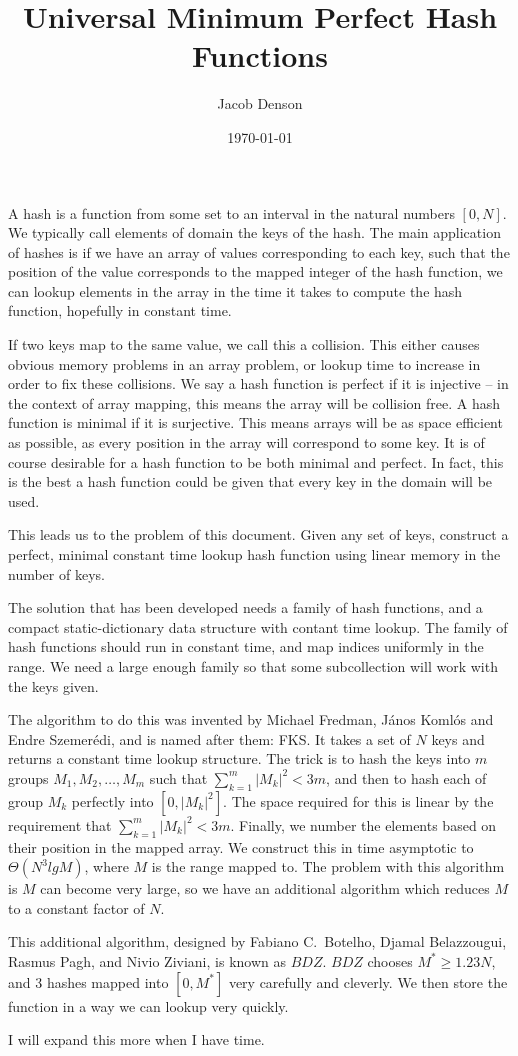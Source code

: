 \documentclass{article}
\title{Universal Minimum Perfect Hash Functions}
\author{Jacob Denson}
\date{\today}
\begin{document}
\maketitle

A hash is a function from some set to an interval in the natural numbers $[0,N]$. We typically call elements of domain the keys of the hash. The main application of hashes is if we have an array of values corresponding to each key, such that the position of the value corresponds to the mapped integer of the hash function, we can lookup elements in the array in the time it takes to compute the hash function, hopefully in constant time.

If two keys map to the same value, we call this a collision. This either causes obvious memory problems in an array problem, or lookup time to increase in order to fix these collisions. We say a hash function is perfect if it is injective -- in the context of array mapping, this means the array will be collision free. A hash function is minimal if it is surjective. This means arrays will be as space efficient as possible, as every position in the array will correspond to some key. It is of course desirable for a hash function to be both minimal and perfect. In fact, this is the best a hash function could be given that every key in the domain will be used.

This leads us to the problem of this document. Given any set of keys, construct a perfect, minimal constant time lookup hash function using linear memory in the number of keys.

The solution that has been developed needs a family of hash functions, and a compact static-dictionary data structure with contant time lookup. The family of hash functions should run in constant time, and map indices uniformly in the range. We need a large enough family so that some subcollection will work with the keys given.

The algorithm to do this was invented by Michael Fredman, J\'{a}nos Koml\'{o}s and Endre Szemer\'{e}di, and is named after them: FKS. It takes a set of $N$ keys and returns a constant time lookup structure. The trick is to hash the keys into $m$ groups $M_1, M_2, \dots, M_m$ such that $\sum_{k = 1}^{m} |M_k|^2 < 3m$, and then to hash each of group $M_k$ perfectly into $[0,|M_k|^2]$. The space required for this is linear by the requirement that $\sum_{k = 1}^{m} |M_k|^2 < 3m$. Finally, we number the elements based on their position in the mapped array. We construct this in time asymptotic to $\Theta(N^3lgM)$, where $M$ is the range mapped to. The problem with this algorithm is $M$ can become very large, so we have an additional algorithm which reduces $M$ to a constant factor of $N$.

This additional algorithm, designed by Fabiano C.\ Botelho, Djamal Belazzougui, Rasmus Pagh, and Nivio Ziviani, is known as $BDZ$. $BDZ$ chooses $M^* \geq 1.23N$, and 3 hashes mapped into $[0,M^*]$ very carefully and cleverly. We then store the function in a way we can lookup very quickly.

I will expand this more when I have time.
\end{document}
